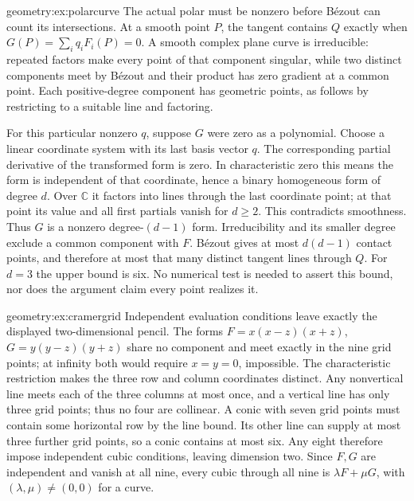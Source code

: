 \begin{solution}{geometry:ex:polarcurve}
\idea The actual polar must be nonzero before B\'ezout can count its intersections.
\writeup At a smooth point $P$, the tangent contains $Q$ exactly when $G(P)=\sum_iq_iF_i(P)=0$. A smooth complex plane curve is irreducible: repeated factors make every point of that component singular, while two distinct components meet by B\'ezout and their product has zero gradient at a common point. Each positive-degree component has geometric points, as follows by restricting to a suitable line and factoring.

For this particular nonzero $q$, suppose $G$ were zero as a polynomial. Choose a linear coordinate system with its last basis vector $q$. The corresponding partial derivative of the transformed form is zero. In characteristic zero this means the form is independent of that coordinate, hence a binary homogeneous form of degree $d$. Over $\mathbb C$ it factors into lines through the last coordinate point; at that point its value and all first partials vanish for $d\ge2$. This contradicts smoothness. Thus $G$ is a nonzero degree-$(d-1)$ form. Irreducibility and its smaller degree exclude a common component with $F$. B\'ezout gives at most $d(d-1)$ contact points, and therefore at most that many distinct tangent lines through $Q$. For $d=3$ the upper bound is six. No numerical test is needed to assert this bound, nor does the argument claim every point realizes it.
\end{solution}
\begin{solution}{geometry:ex:cramergrid}
\idea Independent evaluation conditions leave exactly the displayed two-dimensional pencil.
\writeup The forms $F=x(x-z)(x+z)$, $G=y(y-z)(y+z)$ share no component and meet exactly in the nine grid points; at infinity both would require $x=y=0$, impossible. The characteristic restriction makes the three row and column coordinates distinct. Any nonvertical line meets each of the three columns at most once, and a vertical line has only three grid points; thus no four are collinear. A conic with seven grid points must contain some horizontal row by the line bound. Its other line can supply at most three further grid points, so a conic contains at most six. Any eight therefore impose independent cubic conditions, leaving dimension two. Since $F,G$ are independent and vanish at all nine, every cubic through all nine is $\lambda F+\mu G$, with $(\lambda,\mu)\ne(0,0)$ for a curve.
\end{solution}
